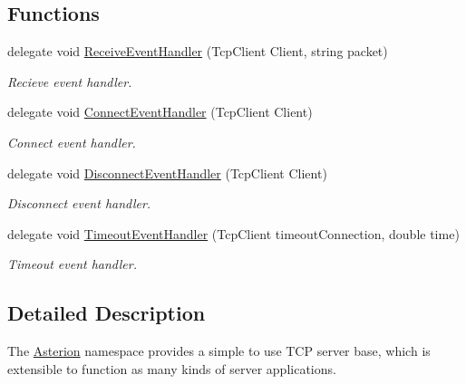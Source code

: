 \subsection*{Functions}
\begin{DoxyCompactItemize}
\item 
\hypertarget{namespaceAsterion_a29f5d934388f3024f1acb2a76ca181d4}{delegate void \hyperlink{namespaceAsterion_a29f5d934388f3024f1acb2a76ca181d4}{Receive\-Event\-Handler} (Tcp\-Client Client, string packet)}\label{namespaceAsterion_a29f5d934388f3024f1acb2a76ca181d4}

\begin{DoxyCompactList}\small\item\em Recieve event handler. \end{DoxyCompactList}\item 
\hypertarget{namespaceAsterion_a4eb424f673809e9b97a563ddd0f4db12}{delegate void \hyperlink{namespaceAsterion_a4eb424f673809e9b97a563ddd0f4db12}{Connect\-Event\-Handler} (Tcp\-Client Client)}\label{namespaceAsterion_a4eb424f673809e9b97a563ddd0f4db12}

\begin{DoxyCompactList}\small\item\em Connect event handler. \end{DoxyCompactList}\item 
\hypertarget{namespaceAsterion_a52e1669733e14e0bf24951e126e81546}{delegate void \hyperlink{namespaceAsterion_a52e1669733e14e0bf24951e126e81546}{Disconnect\-Event\-Handler} (Tcp\-Client Client)}\label{namespaceAsterion_a52e1669733e14e0bf24951e126e81546}

\begin{DoxyCompactList}\small\item\em Disconnect event handler. \end{DoxyCompactList}\item 
\hypertarget{namespaceAsterion_a7857afea4386501bece91ccfcf0096fc}{delegate void \hyperlink{namespaceAsterion_a7857afea4386501bece91ccfcf0096fc}{Timeout\-Event\-Handler} (Tcp\-Client timeout\-Connection, double time)}\label{namespaceAsterion_a7857afea4386501bece91ccfcf0096fc}

\begin{DoxyCompactList}\small\item\em Timeout event handler. \end{DoxyCompactList}\end{DoxyCompactItemize}


\subsection{Detailed Description}
The \hyperlink{namespaceAsterion}{Asterion} namespace provides a simple to use T\-C\-P server base, which is extensible to function as many kinds of server applications. 